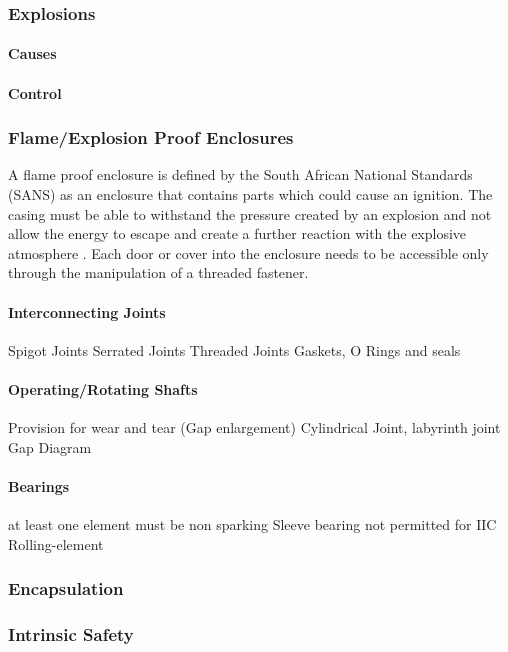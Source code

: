 \subsubsection{Explosions}
\cite{RockwellAutomation, STAHL}
\paragraph{Causes}
\paragraph{Control}

\subsubsection{Flame/Explosion Proof Enclosures}
A flame proof enclosure is defined by the South African National Standards (SANS) as an enclosure that contains parts which could cause an ignition. The casing must be able to withstand the pressure created by an explosion and not allow the energy to escape and create a further reaction with the explosive atmosphere \cite{FProof}. Each door or cover into the enclosure needs to be accessible only through the manipulation of a threaded fastener. 

\paragraph{Interconnecting Joints}
Spigot Joints
Serrated Joints
Threaded Joints 
Gaskets, O Rings and seals

\paragraph{Operating/Rotating Shafts}
Provision for wear and tear (Gap enlargement)
Cylindrical Joint, labyrinth joint
Gap Diagram

\paragraph{Bearings}
at least one element must be non sparking
Sleeve bearing not permitted for $\mathrm{II}$C
Rolling-element


\subsubsection{Encapsulation}
\cite{Encaps}

\subsubsection{Intrinsic Safety}
\cite{Insafe}


       











